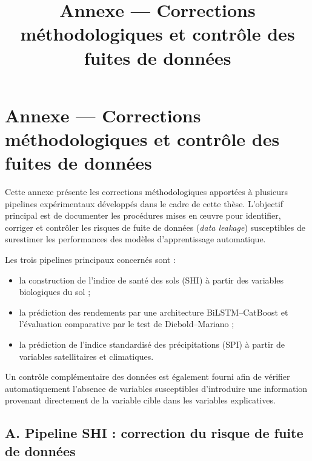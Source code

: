\documentclass[12pt, a4paper, oneside, french]{report}
\title{Annexe — Corrections méthodologiques et contrôle des fuites de données}
\author{}
\date{}
\begin{document}
\maketitle


\chapter*{Annexe — Corrections méthodologiques et contrôle des fuites de données}

Cette annexe présente les corrections méthodologiques apportées à plusieurs
pipelines expérimentaux développés dans le cadre de cette thèse. L'objectif
principal est de documenter les procédures mises en œuvre pour identifier,
corriger et contrôler les risques de fuite de données (\textit{data leakage})
susceptibles de surestimer les performances des modèles d'apprentissage
automatique.

Les trois pipelines principaux concernés sont :

\begin{itemize}
    \item la construction de l'indice de santé des sols (SHI) à partir des
    variables biologiques du sol ;
    \item la prédiction des rendements par une architecture
    BiLSTM--CatBoost et l'évaluation comparative par le test de
    Diebold--Mariano ;
    \item la prédiction de l'indice standardisé des précipitations (SPI)
    à partir de variables satellitaires et climatiques.
\end{itemize}

Un contrôle complémentaire des données est également fourni afin de vérifier
automatiquement l'absence de variables susceptibles d'introduire une
information provenant directement de la variable cible dans les variables
explicatives.

\section*{A. Pipeline SHI : correction du risque de fuite de données}
\end{document}
